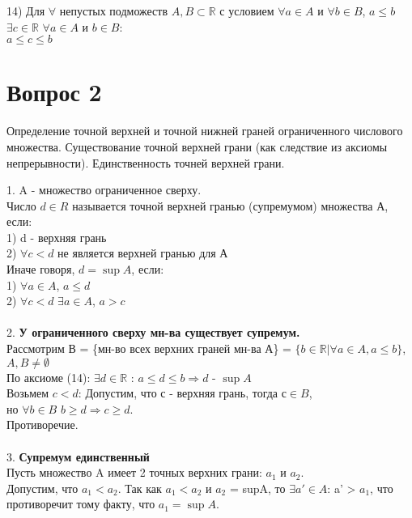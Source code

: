 \documentclass{article}
\DeclareMathOperator{\Exists}{\exists}
\DeclareMathOperator{\Forall}{\forall}
\begin{document}
\begin{center}
   14) Для $\forall $ непустых подможеств $A,B \subset \mathbb{R} $ с условием $ \Forall a \in A$ и $\forall b \in B$, $ a \leq b $ \\
   $\Exists c \in \mathbb{R}$ $\Forall a \in A $ и $ b \in B$: \\
   $ a \leq c \leq b $
\end{center}
\bigskip\bigskip
\section*{Вопрос 2}
 
\begin{center}
   {Определение точной верхней и точной нижней граней ограниченного числового множества. Существование точной верхней грани (как следствие из аксиомы непрерывности). Единственность точней верхней грани.}
\end{center}
   1. A - множество ограниченное сверху. \\
   Число $d \in R $ называется точной верхней гранью (супремумом) множества $А$, если: \\
   1) d - верхняя грань \\
   2) $\Forall  c < d $  не является верхней гранью для $А$ \\
   Иначе говоря, $d = \sup A$, если:\\
   1) $\Forall a \in A$, $ a \leq d $ \\
   2) $\Forall c < d$ $\Exists a \in A$, $a > c $\\
   \\
   2. \textbf{У ограниченного сверху мн-ва существует супремум.}\\
   Рассмотрим $В$ =  \{мн-во всех верхних граней мн-ва А\}
   =  $\{b \in \mathbb{R} | \forall a \in A, a \leq b  \}$, $A,B \neq \emptyset$ \\
   По аксиоме (14): $\Exists d \in \mathbb{R}$ :  $ a \leq d \leq b  \Rightarrow d$ - $\sup A$ \\
   Возьмем $ c < d$:  Допустим, что $с$ - верхняя грань, тогда $ с \in B$, \\
   но $\forall b \in B$ $b \geqslant d \Rightarrow c \geqslant d $. \\
   Противоречие. \\
   \\
   3. \textbf{Супремум  единственный}\\
    Пусть множество A  имеет 2 точных верхних грани: $ a_1 $ и $ a_2$.\\
    Допустим, что $ a_1 < a_2$. Так как $a_1 < a_2$ и $a_2$ = supA, то $\Exists a' \in A$: a' > $ a_1$, что противоречит тому факту, что $ a_1  = \sup A$.
 
\end{document}
